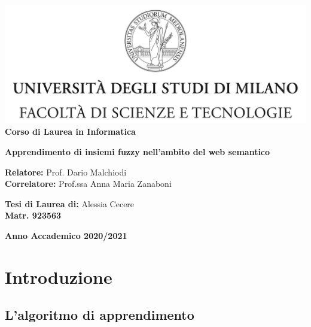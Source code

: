 \documentclass[12pt,a4paper]{report}
\begin{document}
\begin{titlepage}
\begin{center}
\includegraphics[width=\textwidth]{Logo.jpg}\\
{\large{\bf Corso di Laurea in Informatica}}
\end{center}
\vspace{12mm}
\begin{center}
{\huge{\bf Apprendimento di insiemi fuzzy nell'ambito del web semantico}}\\
\end{center}
\vspace{12mm}
\begin{flushleft}
{\large{\bf Relatore:}}
{\large{Prof. Dario Malchiodi}}\\
\vspace{4mm}
{\large{\bf Correlatore:}}
{\large{Prof.ssa Anna Maria Zanaboni}}\\
\end{flushleft}
\vspace{12mm}
\begin{flushright}
{\large{\bf Tesi di Laurea di:}}
{\large{Alessia Cecere}}\\
{\large{\bf Matr. 923563}}\\
\end{flushright}
\vspace{4mm}
\begin{center}
{\large{\bf Anno Accademico 2020/2021}}
\end{center}
\end{titlepage}


\tableofcontents


\chapter{Introduzione}

\section{L'algoritmo di apprendimento}
\end{document}
